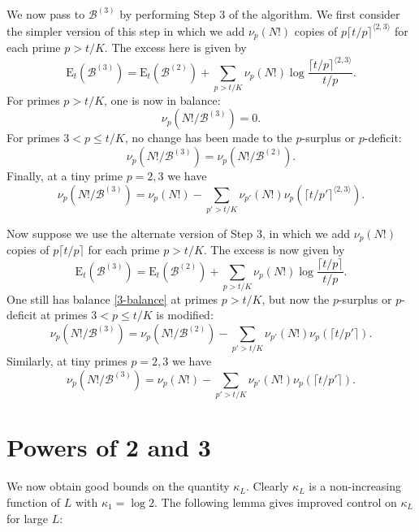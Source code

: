 \documentclass[12pt,a4paper,reqno]{amsart}
\numberwithin{equation}{section}
\theoremstyle{plain}
\theoremstyle{definition}
\newcommand\tuple{{\mathcal B}}
\newcommand\excess{{\mathrm{E}}}
\begin{document}
We now pass to $\tuple^{(3)}$ by performing Step 3 of the algorithm.  We first consider the simpler version of this step in which we add $\nu_p(N!)$ copies of $p \lceil t/p\rceil^{\langle 2,3 \rangle}$ for each prime $p > t/K$.  The excess here is given by
\begin{equation}\label{excess-eq}
  \excess_t(\tuple^{(3)}) = \excess_t(\tuple^{(2)}) + \sum_{p > t/K} \nu_p(N!) \log \frac{\lceil t/p \rceil^{\langle 2,3 \rangle}}{t/p}.
\end{equation}
For primes $p >t/K$, one is now in balance:
\begin{equation}\label{3-balance}  
  \nu_p(N!/\tuple^{(3)}) = 0. \end{equation}
For primes $3 < p \leq t/K$, no change has been made to the $p$-surplus or $p$-deficit:
$$ \nu_p(N!/\tuple^{(3)}) = \nu_p(N!/\tuple^{(2)}).$$
Finally, at a tiny prime $p=2,3$ we have
$$ \nu_{p}(N!/\tuple^{(3)}) = \nu_{p}(N!) - \sum_{p' > t/K} \nu_{p'}(N!) \nu_{p}(\lceil t/p' \rceil^{\langle 2,3 \rangle}).$$

Now suppose we use the alternate version of Step 3, in which we add $\nu_p(N!)$ copies of $p \lceil t/p\rceil$ for each prime $p > t/K$.  The excess is now given by
\begin{equation}\label{excess-eq-alt}
  \excess_t(\tuple^{(3)}) = \excess_t(\tuple^{(2)}) + \sum_{p > t/K} \nu_p(N!) \log \frac{\lceil t/p \rceil}{t/p}.
\end{equation}
One still has balance \eqref{3-balance} at primes $p>t/K$, but now the $p$-surplus or $p$-deficit at primes $3 < p \leq t/K$ is modified:
\begin{equation}\label{mod}
   \nu_p(N!/\tuple^{(3)}) = \nu_p(N!/\tuple^{(2)}) -
\sum_{p' > t/K} \nu_{p'}(N!) \nu_{p}(\lceil t/p' \rceil).\end{equation}
Similarly, at tiny primes $p=2,3$ we have
\begin{equation}\label{tinycon} \nu_p(N!/\tuple^{(3)}) = \nu_p(N!) -
\sum_{p' > t/K} \nu_{p'}(N!) \nu_{p}(\lceil t/p' \rceil).
\end{equation}

\section{Powers of 2 and 3}\label{power-sec}

We now obtain good bounds on the quantity $\kappa_L$.  Clearly $\kappa_L$ is a non-increasing function of $L$ with $\kappa_1 = \log 2$.  The following lemma gives improved control on $\kappa_L$ for large $L$:
\end{document}
